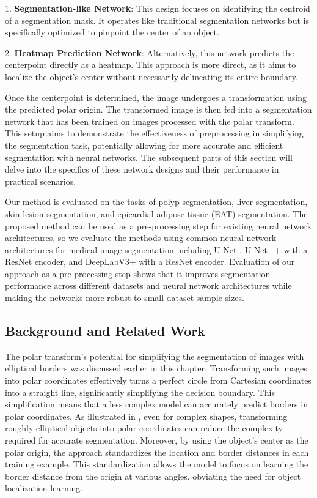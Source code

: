 1. \textbf{Segmentation-like Network}: This design focuses on identifying the centroid of a segmentation mask. It operates like traditional segmentation networks but is specifically optimized to pinpoint the center of an object.

2. \textbf{Heatmap Prediction Network}: Alternatively, this network predicts the centerpoint directly as a heatmap. This approach is more direct, as it aims to localize the object's center without necessarily delineating its entire boundary.

Once the centerpoint is determined, the image undergoes a transformation using the predicted polar origin. The transformed image is then fed into a segmentation network that has been trained on images processed with the polar transform. This setup aims to demonstrate the effectiveness of preprocessing in simplifying the segmentation task, potentially allowing for more accurate and efficient segmentation with neural networks. The subsequent parts of this section will delve into the specifics of these network designs and their performance in practical scenarios.

Our method is evaluated on 
the tasks of polyp segmentation, liver segmentation, skin 
lesion segmentation, and epicardial adipose tissue (EAT) segmentation.
The proposed method can be used as a pre-processing step for 
existing neural network architectures, so we evaluate the methods using
common neural network architectures for medical image segmentation including U-Net 
\cite{ronnebergerUNetConvolutionalNetworks2015}, U-Net++ 
\cite{zhou2019unetplusplus} with a ResNet \cite{heDeepResidualLearning2016} encoder, and DeepLabV3+ \cite{chenEncoderDecoderAtrousSeparable2018} with a ResNet \cite{heDeepResidualLearning2016} encoder. Evaluation of our approach as a pre-processing step shows that it improves segmentation performance across different datasets and neural network architectures while making the networks more robust to small dataset sample sizes.

\subsection{Background and Related Work}

The polar transform's potential for simplifying the segmentation of images with elliptical borders was discussed earlier in this chapter. Transforming such images into polar coordinates effectively turns a perfect circle from Cartesian coordinates into a straight line, significantly simplifying the decision boundary. This simplification means that a less complex model can accurately predict borders in polar coordinates. As illustrated in , even for complex shapes, transforming roughly elliptical objects into polar coordinates can reduce the complexity required for accurate segmentation. Moreover, by using the object's center as the polar origin, the approach standardizes the location and border distances in each training example. This standardization allows the model to focus on learning the border distance from the origin at various angles, obviating the need for object localization learning.

